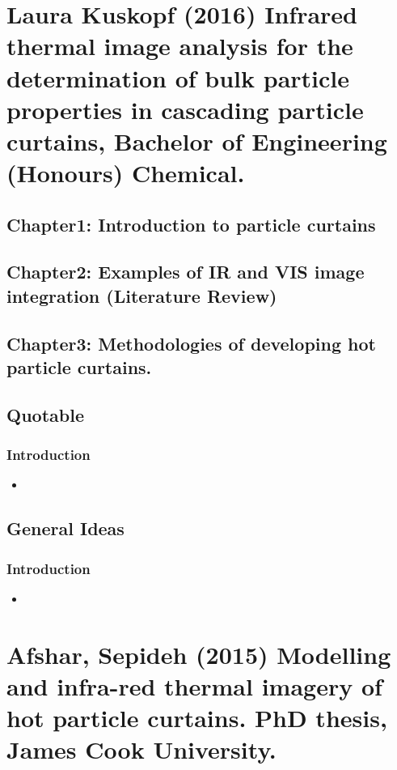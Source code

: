 \documentclass[12pt]{article}
\begin{document}
	
	\section{Laura Kuskopf (2016) Infrared thermal image analysis for the determination of bulk particle properties in cascading particle curtains, Bachelor of Engineering (Honours) Chemical.}
	
		\subsection{Chapter1: Introduction to particle curtains}
		
		\subsection{Chapter2: Examples of IR and VIS image integration (Literature Review)}
		
		\subsection{Chapter3: Methodologies of developing hot particle curtains.}
		
	
		\subsection{Quotable}
	
			\subsubsection{Introduction}
				\begin{itemize}
					\item 
				\end{itemize}
	
		\subsection{General Ideas}
	
			\subsubsection{Introduction}
				\begin{itemize}
					\item 
				\end{itemize}
	
	
	
	
	
	\section{Afshar, Sepideh (2015) Modelling and infra-red thermal imagery of hot particle curtains. PhD thesis, James Cook University.}
	
\end{document}
